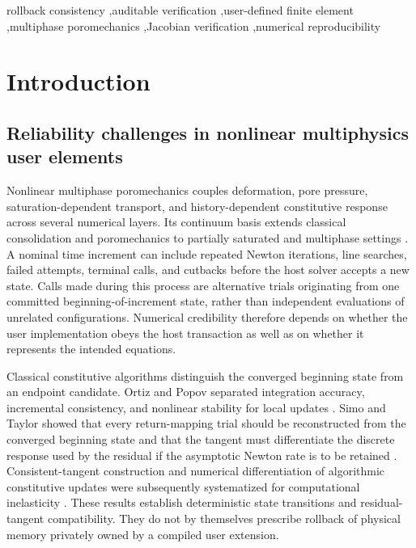 \documentclass[preprint,12pt,authoryear]{elsarticle}
\begin{document}
\begin{frontmatter}
\begin{keyword}
rollback consistency \sep auditable verification \sep user-defined finite element \sep multiphase poromechanics \sep Jacobian verification \sep numerical reproducibility
\end{keyword}

\end{frontmatter}
\linenumbers

\section{Introduction}

\subsection{Reliability challenges in nonlinear multiphysics user elements}

Nonlinear multiphase poromechanics couples deformation, pore pressure, saturation-dependent transport, and history-dependent constitutive response across several numerical layers. Its continuum basis extends classical consolidation and poromechanics to partially saturated and multiphase settings \citep{biot1941,coussy2003,borja1995,borja2004}. A nominal time increment can include repeated Newton iterations, line searches, failed attempts, terminal calls, and cutbacks before the host solver accepts a new state. Calls made during this process are alternative trials originating from one committed beginning-of-increment state, rather than independent evaluations of unrelated configurations. Numerical credibility therefore depends on whether the user implementation obeys the host transaction as well as on whether it represents the intended equations.

Classical constitutive algorithms distinguish the converged beginning state from an endpoint candidate. Ortiz and Popov separated integration accuracy, incremental consistency, and nonlinear stability for local updates \citep{ortiz1985}. Simo and Taylor showed that every return-mapping trial should be reconstructed from the converged beginning state and that the tangent must differentiate the discrete response used by the residual if the asymptotic Newton rate is to be retained \citep{simo1985}. Consistent-tangent construction and numerical differentiation of algorithmic constitutive updates were subsequently systematized for computational inelasticity \citep{miehe1996,simohughes1998,desouzaneto2008}. These results establish deterministic state transitions and residual-tangent compatibility. They do not by themselves prescribe rollback of physical memory privately owned by a compiled user extension.
\end{document}
